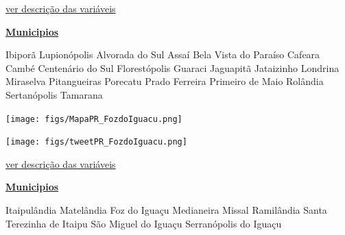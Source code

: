 \documentclass[10pt]{article} %
\begin{document}
\begin{minipage}[t]{.66\linewidth}
\begin{center}

\end{center}
\small{\hyperlink{vartab}{ver descrição das variáveis}}\end{minipage}\hfill\begin{minipage}[t]{.30\linewidth}
\begin{mdframed}[style=sidebar,frametitle={}]
\textbf{\hyperlink{municips}{Municipios}}\begin{itemize}\gsquare Ibiporã 
\gsquare Lupionópolis 
\gsquare Alvorada do Sul 
\gsquare Assaí 
\gsquare Bela Vista do Paraíso 
\gsquare Cafeara 
\gsquare Cambé 
\gsquare Centenário do Sul 
\gsquare Florestópolis 
\gsquare Guaraci 
\gsquare Jaguapitã 
\gsquare Jataizinho 
\gsquare Londrina 
\gsquare Miraselva 
\gsquare Pitangueiras 
\gsquare Porecatu 
\gsquare Prado Ferreira 
\gsquare Primeiro de Maio 
\gsquare Rolândia 
\gsquare Sertanópolis 
\gsquare Tamarana 
\end{itemize}\BackToContents\end{mdframed}\hfill\end{minipage}\newpage\begin{minipage}[t]{.66\linewidth}
\hypertarget{FzdI}{}
\texttt{[image: figs/MapaPR\_FozdoIguacu.png]}\vspace{0.5cm}\vspace{0.5cm}\begin{center}
\texttt{[image: figs/tweetPR\_FozdoIguacu.png]}\end{center}
\begin{center}

\end{center}
\small{\hyperlink{vartab}{ver descrição das variáveis}}\end{minipage}\hfill\begin{minipage}[t]{.30\linewidth}
\begin{mdframed}[style=sidebar,frametitle={}]
\textbf{\hyperlink{municips}{Municipios}}\begin{itemize}\gsquare Itaipulândia 
\gsquare Matelândia 
\gsquare Foz do Iguaçu 
\gsquare Medianeira 
\gsquare Missal 
\gsquare Ramilândia 
\gsquare Santa Terezinha de Itaipu 
\gsquare São Miguel do Iguaçu 
\gsquare Serranópolis do Iguaçu 
\end{itemize}\BackToContents\end{mdframed}\hfill\end{minipage}\newpage\begin{minipage}[t]{.66\linewidth}

\end{minipage}
\end{document}
